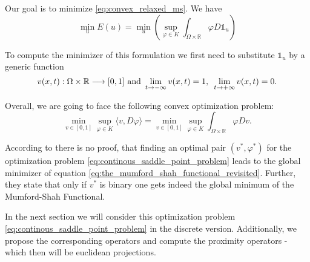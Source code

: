     Our goal is to minimize \ref{eq:convex_relaxed_ms}. We have
    \begin{equation}
        \min_{u} E(u) = \min_{u} \left( \sup_{\varphi \in K} \int_{\Omega \times \mathbb{R}} \varphi D\mathds{1}_{u} \right)
        \label{eq:minimize_convex_relaxed_ms}
    \end{equation}

    To compute the minimizer of this formulation we first need to substitute $\mathds{1}_{u}$ by a generic function
        \begin{equation}
            v(x, t): \Omega \times \mathbb{R} \longrightarrow [0, 1] \,\, \textnormal{and} \,\, \lim_{t \rightarrow -\infty} v(x, t) = 1, \, \, \, \lim_{t \rightarrow +\infty} v(x, t) = 0.
        \label{eq:generic_functions}
        \end{equation}

    Overall, we are going to face the following convex optimization problem:
        \begin{equation}
            \min_{v \in [0, 1]} \sup_{\varphi \in K} \langle v, D\varphi \rangle = \min_{v \in [0, 1]} \sup_{\varphi \in K} \int_{\Omega \times \mathbb{R}} \varphi Dv.
            \label{eq:continous_saddle_point_problem}
        \end{equation}

    According to \cite{Pock-et-al-iccv09} there is no proof, that finding an optimal pair $(v^{\ast}, \varphi^{\ast})$ for the optimization problem \ref{eq:continous_saddle_point_problem} leads to the global minimizer of equation \ref{eq:the_mumford_shah_functional_revisited}. Further, they state that only if $v^{\ast}$ is binary one gets indeed the global minimum of the Mumford-Shah Functional.

    In the next section we will consider this optimization problem \ref{eq:continous_saddle_point_problem} in the discrete version. Additionally, we propose the corresponding operators and compute the proximity operators - which then will be euclidean projections.

